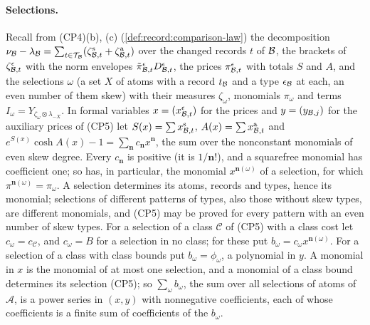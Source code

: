 \paragraph{Selections.}
Recall from (CP4)(b), (c) (\cref{def:record:comparison-law}) the decomposition
$\nu_\mathcal B-\lambda_\mathcal B=\sum_{t\in\mathcal T_\mathcal B}(\zeta^{\rm s}_{\mathcal B,t}+
\zeta^{\rm a}_{\mathcal B,t})$ over the changed records $t$ of $\mathcal B$, the brackets of
$\zeta^\epsilon_{\mathcal B,t}$ with the norm envelopes
$\tilde\pi^\epsilon_{\mathcal B,t}D^\epsilon_{\mathcal B,t}$, the prices
$\pi^\epsilon_{\mathcal B,t}$ with totals $S$ and $A$, and the selections $\omega$ (a
set $X$ of atoms with a record $t_\mathcal B$ and a type $\epsilon_\mathcal B$ at each, an
even number of them skew) with their measures $\zeta_\omega$, monomials
$\pi_\omega$ and terms $I_\omega=Y_{\zeta_\omega\otimes\lambda_{-X}}$.
In formal variables $x=(x^\epsilon_{\mathcal B,t})$ for the prices and
$y=(y_{\mathcal B,j})$ for the auxiliary prices of (CP5) let
$S(x)=\sum x^{\rm s}_{\mathcal B,t}$, $A(x)=\sum x^{\rm a}_{\mathcal B,t}$ and
$e^{S(x)}\cosh A(x)-1=\sum_{\boldsymbol n}c_{\boldsymbol n}x^{\boldsymbol n}$, the
sum over the nonconstant monomials of even skew degree. Every
$c_{\boldsymbol n}$ is positive (it is $1/\boldsymbol n!$), and a squarefree
monomial has coefficient one; so has, in particular, the monomial
$x^{\boldsymbol n(\omega)}$ of a selection, for which
$\pi^{\boldsymbol n(\omega)}=\pi_\omega$. A selection determines its atoms,
records and types, hence its monomial; selections of different patterns of
types, also those without skew types, are different monomials, and (CP5) may
be proved for every pattern with an even number of skew types. For a
selection of a class $\mathcal C$ of (CP5) with a class cost let
$c_\omega=c_{\mathcal C}$, and $c_\omega=B$ for a selection in no class; for
these put $b_\omega=c_\omega x^{\boldsymbol n(\omega)}$. For a selection of a
class with class bounds put $b_\omega=\phi_\omega$, a polynomial in $y$. A
monomial in $x$ is the monomial of at most one selection, and a monomial of a
class bound determines its selection (CP5); so $\sum_\omega b_\omega$, the sum
over all selections of atoms of $\mathcal A$, is a power series in $(x,y)$
with nonnegative coefficients, each of whose coefficients is a finite sum
of coefficients of the $b_\omega$.

